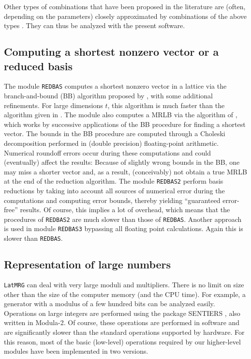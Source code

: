 Other types of combinations that have been proposed in the literature
are (often, depending on the parameters) closely approximated by
combinations of the above types \cite{rLEC91b,rLEC96b}.
They can thus be analyzed with the present software.

\subsection {Computing a shortest nonzero vector or a reduced basis}

The module {\tt REDBAS} computes a shortest nonzero vector in a
lattice via the branch-and-bound (BB) algorithm proposed by \cite{mFIN85a},
with some additional refinements. 
For large dimensions $t$, this algorithm is much faster than the
algorithm given in \cite {rDIE75a,rKNU81a}.
The module also computes a MRLB via the algorithm of \cite{rAFF85a},
which works by successive applications of the BB procedure 
for finding a shortest vector.
The bounds in the BB procedure are computed through
a Choleski decomposition performed in (double precision)
floating-point arithmetic.
Numerical roundoff errors occur during these computations
and could (eventually) affect the results:
Because of slightly wrong bounds in the BB, one may miss a shorter
vector and, as a result, (conceivably) not obtain a true MRLB at the 
end of the reduction algorithm.
The module {\tt REDBAS2} perform basis reductions
by taking into account all sources of numerical error during
the computations and computing error bounds,
thereby yielding ``guaranteed error-free'' results.
Of course, this implies a lot of overhead, which means that the
procedures of {\tt REDBAS2} are much slower than
those of {\tt REDBAS}.
Another approach is used in module {\tt REDBAS3} bypassing all floating
point calculations. Again this is slower than {\tt REDBAS}.

\subsection {Representation of large numbers}

{\tt LatMRG} can deal with very large moduli and multipliers.
There is no limit on size other than the size of the computer memory
(and the CPU time).
For example, a generator with a modulus of a few hundred bits can be
analyzed easily.
Operations on large integers are performed using the package SENTIERS
\cite {iLEC88d}, also written in Modula-2.
Of course, these operations are performed in software and are significantly
slower than the standard operations supported by hardware.
For this reason, most of the basic (low-level) operations required by our
higher-level modules have been implemented in two versions.


